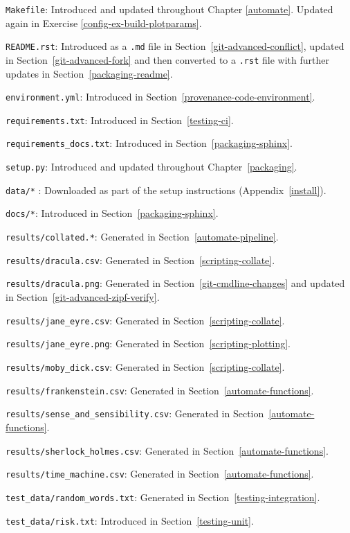 \documentclass[
]{krantz}
\begin{document}
\texttt{Makefile}: Introduced and updated throughout Chapter \ref{automate}.
Updated again in Exercise \ref{config-ex-build-plotparams}.

\texttt{README.rst}: Introduced as a \texttt{.md} file in Section~\ref{git-advanced-conflict},
updated in Section~\ref{git-advanced-fork} and then converted to a \texttt{.rst} file
with further updates in Section~\ref{packaging-readme}.

\texttt{environment.yml}: Introduced in Section~\ref{provenance-code-environment}.

\texttt{requirements.txt}: Introduced in Section~\ref{testing-ci}.

\texttt{requirements\_docs.txt}: Introduced in Section~\ref{packaging-sphinx}.

\texttt{setup.py}: Introduced and updated throughout Chapter~\ref{packaging}.

\texttt{data/*} : Downloaded as part of the setup instructions (Appendix~\ref{install}).

\texttt{docs/*}: Introduced in Section~\ref{packaging-sphinx}.

\texttt{results/collated.*}: Generated in Section~\ref{automate-pipeline}.

\texttt{results/dracula.csv}: Generated in Section~\ref{scripting-collate}.

\texttt{results/dracula.png}: Generated in Section~\ref{git-cmdline-changes} and updated in Section~\ref{git-advanced-zipf-verify}.

\texttt{results/jane\_eyre.csv}: Generated in Section~\ref{scripting-collate}.

\texttt{results/jane\_eyre.png}: Generated in Section~\ref{scripting-plotting}.

\texttt{results/moby\_dick.csv}: Generated in Section~\ref{scripting-collate}.

\texttt{results/frankenstein.csv}: Generated in Section~\ref{automate-functions}.

\texttt{results/sense\_and\_sensibility.csv}: Generated in Section~\ref{automate-functions}.

\texttt{results/sherlock\_holmes.csv}: Generated in Section~\ref{automate-functions}.

\texttt{results/time\_machine.csv}: Generated in Section~\ref{automate-functions}.

\texttt{test\_data/random\_words.txt}: Generated in Section~\ref{testing-integration}.

\texttt{test\_data/risk.txt}: Introduced in Section~\ref{testing-unit}.
\end{document}
